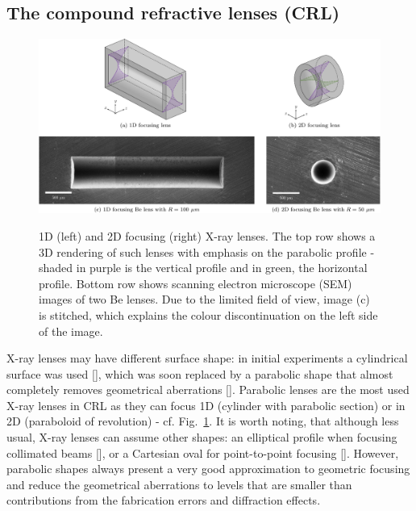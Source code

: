 \begin{refsection}
\section{The compound refractive lenses (CRL)}\label{sec:CRL}

\begin{figure}[t]
    \centering
    {\includegraphics[width=.8\linewidth]{figures/ch03/1D2D.pdf}}
    \caption[1D and 2D focusing X-ray lenses]{1D (left) and 2D focusing (right) X-ray lenses. The top row shows a 3D rendering of such lenses with emphasis on the parabolic profile - shaded in purple is the vertical profile and in green, the horizontal profile. Bottom row shows scanning electron microscope (SEM) images of two Be lenses. Due to the limited field of view, image (c) is stitched, which explains the colour discontinuation on the left side of the image.} %
    \label{fig:1D2D_lenses}
\end{figure}

X-ray lenses may have different surface shape: in initial experiments a cylindrical surface was used [\cite{Snigirev1996, Protopopov1998}], which was soon replaced by a parabolic shape that almost completely removes geometrical aberrations [\cite{Elleaume1998, Lengeler1999}]. Parabolic lenses are the most used X-ray lenses in CRL as they can focus 1D (cylinder with parabolic section) or in 2D (paraboloid of revolution) - cf. Fig.~\ref{fig:1D2D_lenses}. It is worth noting, that although less usual, X-ray lenses can assume other shapes: an elliptical profile when focusing collimated beams [\cite{Evans-Lutterodt2003}], or a Cartesian oval for point-to-point focusing [\cite{SanchezdelRio2012}]. However, parabolic shapes always present a very good approximation to geometric focusing and reduce the geometrical aberrations to levels that are smaller than contributions from the fabrication errors and diffraction effects.


\end{refsection}
